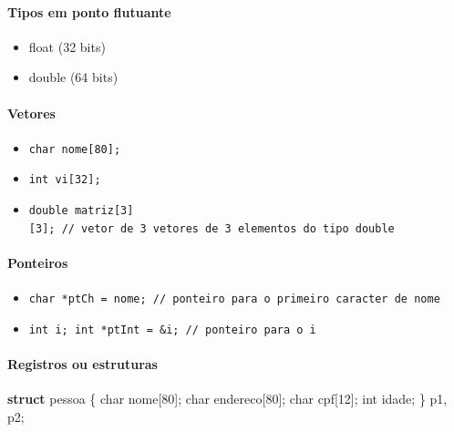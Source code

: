 \documentclass[
]{article}
\newenvironment{Shaded}{}{}
\newcommand{\DataTypeTok}[1]{\textcolor[rgb]{0.56,0.13,0.00}{#1}}
\newcommand{\DecValTok}[1]{\textcolor[rgb]{0.25,0.63,0.44}{#1}}
\newcommand{\KeywordTok}[1]{\textcolor[rgb]{0.00,0.44,0.13}{\textbf{#1}}}
\newcommand{\NormalTok}[1]{#1}
\providecommand{\tightlist}{%
  \setlength{\itemsep}{0pt}\setlength{\parskip}{0pt}}
\begin{document}
\hypertarget{tipos-em-ponto-flutuante}{%
\paragraph{Tipos em ponto flutuante}\label{tipos-em-ponto-flutuante}}

\begin{itemize}
\tightlist
\item
  float (32 bits)
\item
  double (64 bits)
\end{itemize}

\hypertarget{vetores}{%
\paragraph{Vetores}\label{vetores}}

\begin{itemize}
\tightlist
\item
  \texttt{char\ nome{[}80{]};}
\item
  \texttt{int\ vi{[}32{]};}
\item
  \texttt{double\ matriz{[}3{]}{[}3{]};\ //\ vetor\ de\ 3\ vetores\ de\ 3\ elementos\ do\ tipo\ double}
\end{itemize}

\hypertarget{ponteiros}{%
\paragraph{Ponteiros}\label{ponteiros}}

\begin{itemize}
\tightlist
\item
  \texttt{char\ *ptCh\ =\ nome;\ //\ ponteiro\ para\ o\ primeiro\ caracter\ de\ nome}
\item
  \texttt{int\ i;\ int\ *ptInt\ =\ \&i;\ //\ ponteiro\ para\ o\ i}
\end{itemize}

\hypertarget{registros-ou-estruturas}{%
\paragraph{Registros ou estruturas}\label{registros-ou-estruturas}}

\begin{Shaded}
\begin{Highlighting}[]
\KeywordTok{struct}\NormalTok{ pessoa \{}
  \DataTypeTok{char}\NormalTok{ nome[}\DecValTok{80}\NormalTok{];}
  \DataTypeTok{char}\NormalTok{ endereco[}\DecValTok{80}\NormalTok{];}
  \DataTypeTok{char}\NormalTok{ cpf[}\DecValTok{12}\NormalTok{];}
  \DataTypeTok{int}\NormalTok{ idade;}
\NormalTok{\} p1, p2;}
\end{Highlighting}
\end{Shaded}
\end{document}
